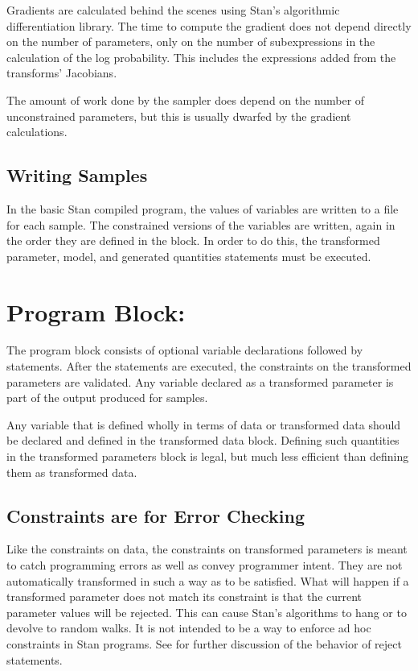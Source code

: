 Gradients are calculated behind the scenes using Stan's algorithmic
differentiation library.  The time to compute the gradient does not
depend directly on the number of parameters, only on the number of
subexpressions in the calculation of the log probability.  This
includes the expressions added from the transforms' Jacobians.

The amount of work done by the sampler does depend on the number of
unconstrained parameters, but this is usually dwarfed by the gradient
calculations.

\subsection{Writing Samples}

In the basic Stan compiled program, the values of variables are
written to a file for each sample.  The constrained versions of the
variables are written, again in the order they are defined in the
 block.  In order to do this, the transformed
parameter, model, and generated quantities statements must be
executed.


\section{Program Block: }

The  program block consists of optional
variable declarations followed by statements.  After the statements
are executed, the constraints on the transformed parameters are
validated.  Any variable declared as a transformed parameter is part
of the output produced for samples.

Any variable that is defined wholly in terms of data or transformed
data should be declared and defined in the transformed data block.
Defining such quantities in the transformed parameters block is legal,
but much less efficient than defining them as transformed data.

\subsection{Constraints are for Error Checking}

Like the constraints on data, the constraints on transformed
parameters is meant to catch programming errors as well as convey
programmer intent.  They are not automatically transformed in such a
way as to be satisfied.  What will happen if a transformed parameter
does not match its constraint is that the current parameter values
will be rejected.  This can cause Stan's algorithms to hang or
to devolve to random walks.  It is not intended to be a way to enforce
ad hoc constraints in Stan programs.   See 
for further discussion of the behavior of reject statements.



